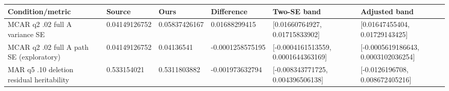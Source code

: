 \begin{longtable}{p{1.6in}p{.65in}p{.65in}p{.65in}p{1.1in}p{1.1in}}
\toprule
Condition/metric & Source & Ours & Difference & Two-SE band & Adjusted band\\\midrule\endhead
MCAR q2 .02 full A variance SE & 0.04149126752 & 0.05837426167 & 0.01688299415 & [0.01660764927, 0.01715833902] & [0.01647455404, 0.01729143425]\\
MCAR q2 .02 full A path SE (exploratory) & 0.04149126752 & 0.04136541 & -0.0001258575195 & [-0.0004161513559, 0.0001644363169] & [-0.0005619186643, 0.0003102036254]\\
MAR q5 .10 deletion residual heritability & 0.533154021 & 0.5311803882 & -0.001973632794 & [-0.008343771725, 0.004396506138] & [-0.0126196708, 0.008672405216]\\
\bottomrule\end{longtable}
